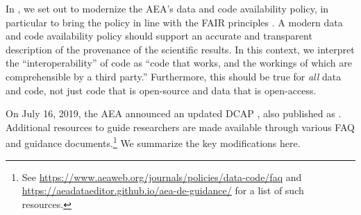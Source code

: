 \documentclass[PP]{AEA}
\begin{document}
In  \citet{10.1257/pandp.109.718}, we set out to modernize the AEA's data and code availability policy, in particular to bring the policy in line with  the \ac{FAIR} principles \citep{FORCE11FAIRDATAPRINCIPLES}.  A modern data and code availability policy should support an accurate and transparent description of the provenance of the scientific results.  In this context, we interpret the ``interoperability'' of code as ``code that works, and the workings of which are comprehensible by a third party.'' Furthermore, this should be true for \textit{all} data and code, not just code that is open-source and data that is open-access.


On July 16, 2019, the AEA announced an updated \ac{DCAP} \citep{AEA-announcement-July-2019}, also published as \citet{10.1257/pandp.110.dcap}. Additional resources to guide researchers are made available through various \ac{FAQ} and guidance documents.\footnote{See \url{https://www.aeaweb.org/journals/policies/data-code/faq} and \url{https://aeadataeditor.github.io/aea-de-guidance/} for a list of such resources.} We summarize the key modifications here.
\end{document}
